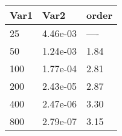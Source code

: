 \begin{tabular}{lll}
Var1 & Var2 & order \\ 
\hline 
25 & 4.46e-03 & ---- \\ 
50 & 1.24e-03 & 1.84 \\ 
100 & 1.77e-04 & 2.81 \\ 
200 & 2.43e-05 & 2.87 \\ 
400 & 2.47e-06 & 3.30 \\ 
800 & 2.79e-07 & 3.15 \\ 
\hline 
\end{tabular}